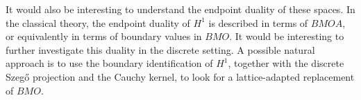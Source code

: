 \documentclass[12pt,a4paper,reqno]{amsart}
\newtheorem{thm}{Theorem}[section]
\theoremstyle{definition}
\theoremstyle{definition}\newtheorem{defn}[thm]{Definition}
\newcommand{\nb}[3]{{\colorbox{#2}{\bfseries\sffamily\scriptsize\textcolor{white}{#1}}} 
    {\textcolor{#2}{\sf\small\textit{#3}}}}
\newcommand{\eug}[1]{\nb{Eug}{jazzberryjam}{#1}}
\newcommand{\matteo}[1]{\nb{Matteo}{blue}{#1}}
\begin{document}
    It would also be interesting to understand the endpoint duality of these spaces.
    In the classical theory, the endpoint duality of $H^1$ is described in terms of
    $BMOA$, or equivalently in terms of boundary values in $BMO$. It would be interesting to further investigate this duality in the discrete setting. A possible natural approach is to use the boundary identification of $H^1$, together
    with the discrete Szeg\H{o} projection and the Cauchy kernel, to look for a
    lattice-adapted replacement of $BMO$.
    
    
    
    
    
\end{document}
